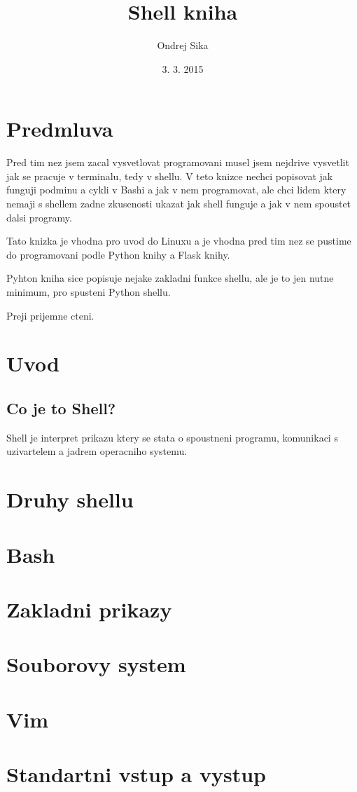 \documentclass[12pt,a5paper]{article}
\title{Shell kniha}
\author{Ondrej Sika}
\date{3. 3. 2015}
\begin{document}


\section{Predmluva}

Pred tim nez jsem zacal vysvetlovat programovani musel jsem nejdrive vysvetlit jak se pracuje v terminalu, tedy v shellu. V teto knizce nechci popisovat jak funguji podminu a cykli v Bashi a jak v nem programovat, ale chci lidem ktery nemaji s shellem zadne zkusenosti ukazat jak shell funguje a jak v nem spoustet dalsi programy.

Tato knizka je vhodna pro uvod do Linuxu a je vhodna pred tim nez se pustime do programovani podle Python knihy a Flask knihy.

Pyhton kniha sice popisuje nejake zakladni funkce shellu, ale je to jen nutne minimum, pro spusteni Python shellu.

Preji prijemne cteni.


\section{Uvod}
\subsection{Co je to Shell?}

Shell je interpret prikazu ktery se stata o spoustneni programu, komunikaci s uzivartelem a jadrem operacniho systemu. \cite{wiki-shell}

\section{Druhy shellu}
\section{Bash}
\section{Zakladni prikazy}
\section{Souborovy system}
\section{Vim}
\section{Standartni vstup a vystup}
\end{document}
